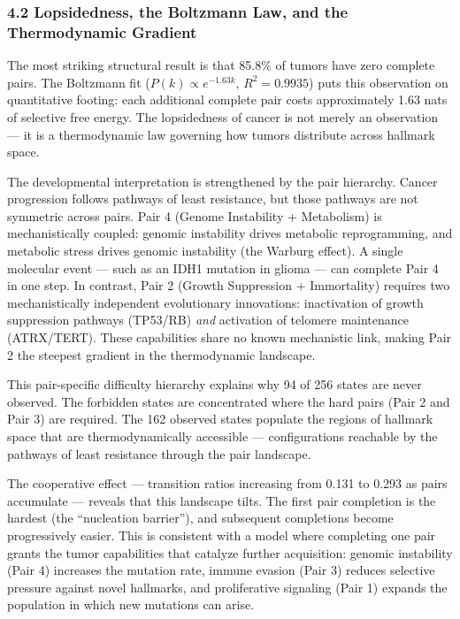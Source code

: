 \documentclass[
  11pt,
]{article}
\begin{document}
\subsubsection{4.2 Lopsidedness, the Boltzmann Law, and the
Thermodynamic
Gradient}\label{lopsidedness-the-boltzmann-law-and-the-thermodynamic-gradient}

The most striking structural result is that 85.8\% of tumors have zero
complete pairs. The Boltzmann fit (\(P(k) \propto e^{-1.63 k}\),
\(R^2 = 0.9935\)) puts this observation on quantitative footing: each
additional complete pair costs approximately 1.63 nats of selective free
energy. The lopsidedness of cancer is not merely an observation --- it
is a thermodynamic law governing how tumors distribute across hallmark
space.

The developmental interpretation is strengthened by the pair hierarchy.
Cancer progression follows pathways of least resistance, but those
pathways are not symmetric across pairs. Pair 4 (Genome Instability +
Metabolism) is mechanistically coupled: genomic instability drives
metabolic reprogramming, and metabolic stress drives genomic instability
(the Warburg effect). A single molecular event --- such as an IDH1
mutation in glioma --- can complete Pair 4 in one step. In contrast,
Pair 2 (Growth Suppression + Immortality) requires two mechanistically
independent evolutionary innovations: inactivation of growth suppression
pathways (TP53/RB) \emph{and} activation of telomere maintenance
(ATRX/TERT). These capabilities share no known mechanistic link, making
Pair 2 the steepest gradient in the thermodynamic landscape.

This pair-specific difficulty hierarchy explains why 94 of 256 states
are never observed. The forbidden states are concentrated where the hard
pairs (Pair 2 and Pair 3) are required. The 162 observed states populate
the regions of hallmark space that are thermodynamically accessible ---
configurations reachable by the pathways of least resistance through the
pair landscape.

The cooperative effect --- transition ratios increasing from 0.131 to
0.293 as pairs accumulate --- reveals that this landscape tilts. The
first pair completion is the hardest (the ``nucleation barrier''), and
subsequent completions become progressively easier. This is consistent
with a model where completing one pair grants the tumor capabilities
that catalyze further acquisition: genomic instability (Pair 4)
increases the mutation rate, immune evasion (Pair 3) reduces selective
pressure against novel hallmarks, and proliferative signaling (Pair 1)
expands the population in which new mutations can arise.
\end{document}
